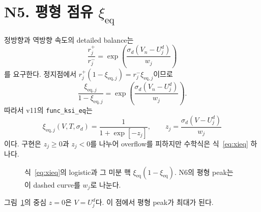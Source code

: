 \documentclass[11pt,a4paper]{article}
\newcommand{\eq}{\mathrm{eq}}
\begin{document}
\section{N5. 평형 점유 $\xi_{\eq}$}\label{sec:N5}
정방향과 역방향 속도의 detailed balance는
\begin{equation}
\frac{r_j^+}{r_j^-}=\exp\!\left(\frac{\sigma_d(V_n-U_j^d)}{w_j}\right)
\label{eq:db}
\end{equation}
를 요구한다. 정지점에서 $r_j^+(1-\xi_{\eq,j})=r_j^-\xi_{\eq,j}$이므로
\begin{equation}
\frac{\xi_{\eq,j}}{1-\xi_{\eq,j}}
=\exp\!\left(\frac{\sigma_d(V_n-U_j^d)}{w_j}\right).
\label{eq:logit}
\end{equation}
따라서 v11의 \texttt{func\_ksi\_eq}는
\begin{equation}
\boxed{\;\xi_{\eq,j}(V,T,\sigma_d)
=\frac{1}{1+\exp[-z_j]},\qquad
z_j=\frac{\sigma_d(V-U_j^d)}{w_j}\;}
\label{eq:xieq}
\end{equation}
이다. 구현은 $z_j\ge0$과 $z_j<0$를 나누어 overflow를 피하지만 수학식은 식~\eqref{eq:xieq} 하나다.

\begin{figure}[t]
\centering
{}
\caption{식~\eqref{eq:xieq}의 logistic과 그 미분 핵 $\xi_{\eq}(1-\xi_{\eq})$. N6의 평형 peak는 이 dashed curve를 $w_j$로 나눈다.}
\label{fig:logisticpeak}
\end{figure}

그림~\ref{fig:logisticpeak}의 중심 $z=0$은 $V=U_j^d$다. 이 점에서 평형 peak가 최대가 된다.

\end{document}
